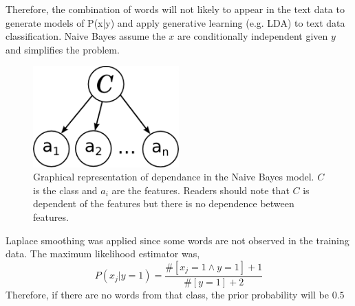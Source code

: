 \documentclass[10pt,twocolumn]{article}
\begin{document}
Therefore, the combination of words will not likely to appear in the text data to generate models of P(x|y) and apply generative learning (e.g. LDA) to text data classification.
Naive Bayes assume the $x$ are conditionally independent given $y$ and simplifies the problem.\autocite{jordan2002discriminative}

\begin{figure}
    \centering  
  	\includegraphics[width=0.5\textwidth]{./sysmag_bayes.png}
  	\caption{Graphical representation of dependance in the Naive Bayes model. $C$ is the class and $a_i$ are the features. Readers should note that $C$ is dependent of the features but there is no dependence between features. }
  	\label{bayesnet}
\end{figure}

Laplace smoothing was applied since some words are not observed in the training data. The maximum likelihood estimator was,
\[
P(x_j|y=1) = \frac {\#[x_j=1 \land y=1]+1}{\#[y=1]+2}
\]
Therefore, if there are no words from that class, the prior probability will be $0.5$
\end{document}
